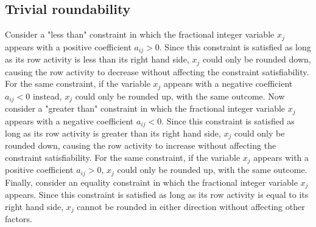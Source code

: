 \documentclass[a4paper,12pt,twoside]{scrbook}
\begin{document}
\subsection{Trivial roundability} \label{sec:trivialround}
Consider a "less than" constraint in which the fractional integer variable $x_j$ appears with a positive coefficient $a_{ij} > 0$. Since this constraint is satisfied as long as its row activity is less than its right hand side, $x_j$ could only be rounded down, causing the row activity to decrease without affecting the constraint satisfiability. For the same constraint, if the variable $x_j$ appears with a negative coefficient $a_{ij} < 0$ instead, $x_j$ could only be rounded up, with the same outcome.
Now consider a "greater than" constraint in which the fractional integer variable $x_j$ appears with a negative coefficient $a_{ij} < 0$. Since this constraint is satisfied as long as its row activity is greater than its right hand side, $x_j$ could only be rounded down, causing the row activity to increase without affecting the constraint satisfiability. For the same constraint, if the variable $x_j$ appears with a positive coefficient $a_{ij} > 0$, $x_j$ could only be rounded up, with the same outcome.
Finally, consider an equality constraint in which the fractional integer variable $x_j$ appears. Since this constraint is satisfied as long as its row activity is equal to its right hand side, $x_j$ cannot be rounded in either direction without affecting other factors. \par
\end{document}
